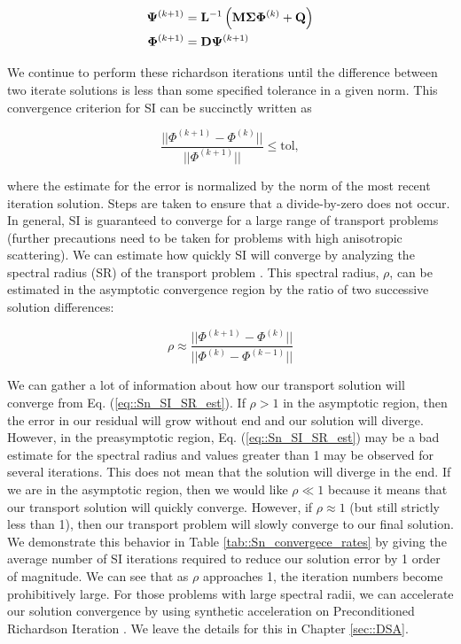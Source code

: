 \begin{equation}
\label{eq::Sn_si_iter}
\begin{aligned}
 {\bf \Psi}^{(k+1)} &= {\bf L}^{-1} \left(  {\bf M} {\bf \Sigma} {\bf \Phi}^{(k)} +  {\bf Q} \right) \\
{\bf \Phi}^{(k+1)} &=  {\bf D} {\bf \Psi}^{(k+1)}
\end{aligned}
\end{equation}

We continue to perform these richardson iterations until the difference between two iterate solutions is less than some specified tolerance in a given norm. This convergence criterion for SI can be succinctly written as

\begin{equation}
\label{eq::Sn_SI_conv_crit}
\frac{|| \Phi^{(k+1)} - \Phi^{(k)} ||}{|| \Phi^{(k+1)} ||} \leq \text{tol} ,
\end{equation}

\noindent where the estimate for the error is normalized by the norm of the most recent iteration solution. Steps are taken to ensure that a divide-by-zero does not occur. In general, SI is guaranteed to converge for a large range of transport problems (further precautions need to be taken for problems with high anisotropic scattering). We can estimate how quickly SI will converge by analyzing the spectral radius (SR) of the transport problem \cite{ref::adams_larsen_iter_methods}. This spectral radius, $\rho$, can be estimated in the asymptotic convergence region by the ratio of two successive solution differences:

\begin{equation}
\label{eq::Sn_SI_SR_est}
\rho \approx \frac{|| \Phi^{(k+1)} - \Phi^{(k)} ||}{|| \Phi^{(k)} - \Phi^{(k-1)} ||} 
\end{equation}

\noindent We can gather a lot of information about how our transport solution will converge from Eq. (\ref{eq::Sn_SI_SR_est}). If $\rho>1$ in the asymptotic region, then the error in our residual will grow without end and our solution will diverge. However, in the preasymptotic region, Eq. (\ref{eq::Sn_SI_SR_est}) may be a bad estimate for the spectral radius and values greater than 1 may be observed for several iterations. This does not mean that the solution will diverge in the end. If we are in the asymptotic region, then we would like $\rho \ll 1$ because it means that our transport solution will quickly converge. However, if $\rho \approx 1$ (but still strictly less than 1), then our transport problem will slowly converge to our final solution. We demonstrate this behavior in Table \ref{tab::Sn_convergece_rates} by giving the average number of SI iterations required to reduce our solution error by 1 order of magnitude. We can see that as $\rho$ approaches 1, the iteration numbers become prohibitively large. For those problems with large spectral radii, we can accelerate our solution convergence by using synthetic acceleration on Preconditioned Richardson Iteration \cite{ref::adams_larsen_iter_methods}. We leave the details for this in Chapter \ref{sec::DSA}.

